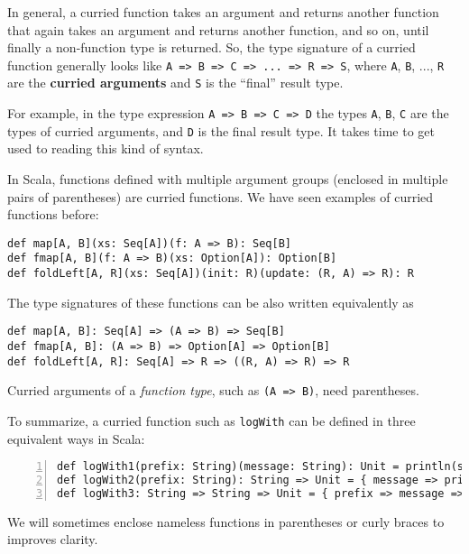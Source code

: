 In general, a curried function takes an argument and returns another
function that again takes an argument and returns another function,
and so on, until finally a non-function type is returned. So, the
type signature of a curried function generally looks like \lstinline!A => B => C => ... => R => S!,
where \lstinline!A!, \lstinline!B!, ..., \lstinline!R! are the
\textbf{curried arguments} and \lstinline!S!
is the ``final'' result type.

For example, in the type expression \lstinline!A => B => C => D!
the types \lstinline!A!, \lstinline!B!, \lstinline!C! are the types
of curried arguments, and \lstinline!D! is the final result type.
It takes time to get used to reading this kind of syntax.

In Scala, functions defined with multiple argument groups (enclosed
in multiple pairs of parentheses) are curried functions. We have seen
examples of curried functions before:
\begin{lstlisting}
def map[A, B](xs: Seq[A])(f: A => B): Seq[B]
def fmap[A, B](f: A => B)(xs: Option[A]): Option[B]
def foldLeft[A, R](xs: Seq[A])(init: R)(update: (R, A) => R): R
\end{lstlisting}
The type signatures of these functions can be also written equivalently
as
\begin{lstlisting}
def map[A, B]: Seq[A] => (A => B) => Seq[B]
def fmap[A, B]: (A => B) => Option[A] => Option[B]
def foldLeft[A, R]: Seq[A] => R => ((R, A) => R) => R
\end{lstlisting}
Curried arguments of a \emph{function type}, such as \lstinline!(A => B)!,
need parentheses.

To summarize, a curried function such as \lstinline!logWith! can
be defined in three equivalent ways in Scala:
\begin{lstlisting}[numbers=left,numberstyle={\small}]
def logWith1(prefix: String)(message: String): Unit = println(s"$prefix: $message")
def logWith2(prefix: String): String => Unit = { message => println(s"$prefix: $message") }
def logWith3: String => String => Unit = { prefix => message => println(s"$prefix: $message") }
\end{lstlisting}
We will sometimes enclose nameless functions in parentheses or curly
braces to improves clarity. 

